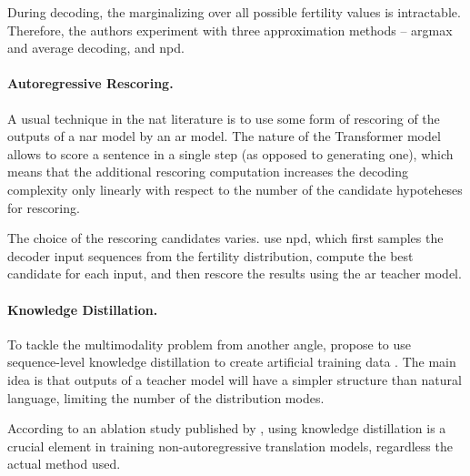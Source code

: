 During decoding, the marginalizing over all possible fertility values is
intractable. Therefore, the authors experiment with three approximation methods
-- argmax and average decoding, and \ac{npd}.

\paragraph{Autoregressive Rescoring.} A usual technique in the \ac{nat}
literature is to use some form of rescoring of the outputs of a \acl{nar} model
by an \acl{ar} model. The nature of the Transformer model allows to score a
sentence in a single step (as opposed to generating one), which means that the
additional rescoring computation increases the decoding complexity only
linearly with respect to the number of the candidate hypoteheses for rescoring.

The choice of the rescoring candidates varies. \citet{gu2017nonautoregressive}
use \acf{npd}, which first samples the decoder input sequences from the
fertility distribution, compute the best candidate for each input, and then
rescore the results using the \ac{ar} teacher model.

\paragraph{Knowledge Distillation.} To tackle the multimodality problem from
another angle, \citet{gu2017nonautoregressive} propose to use sequence-level
knowledge distillation to create artificial training data
\citep{kim-rush-2016-sequence}. The main idea is that outputs of a teacher
model will have a simpler structure than natural language, limiting the number
of the distribution modes.

According to an ablation study published by \citet{gu-kong-2021-fully}, using
knowledge distillation is a crucial element in training non-autoregressive
translation models, regardless the actual method used.

